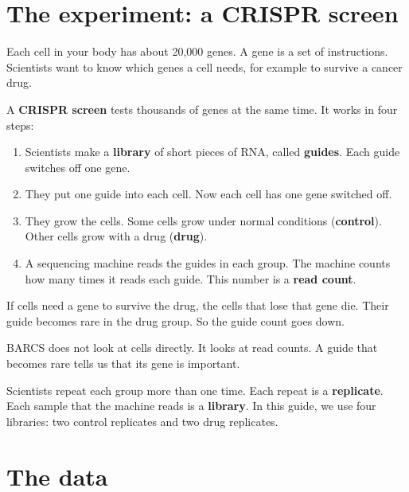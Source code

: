 \section{The experiment: a CRISPR screen}

Each cell in your body has about 20{,}000 genes. A gene is a set of
instructions. Scientists want to know which genes a cell needs, for example
to survive a cancer drug.

A \textbf{CRISPR screen} tests thousands of genes at the same time. It works
in four steps:

\begin{enumerate}
\item Scientists make a \textbf{library} of short pieces of RNA, called
  \textbf{guides}. Each guide switches off one gene.
\item They put one guide into each cell. Now each cell has one gene switched
  off.
\item They grow the cells. Some cells grow under normal conditions
  (\textbf{control}). Other cells grow with a drug (\textbf{drug}).
\item A sequencing machine reads the guides in each group. The machine
  counts how many times it reads each guide. This number is a
  \textbf{read count}.
\end{enumerate}

If cells need a gene to survive the drug, the cells that lose that gene die.
Their guide becomes rare in the drug group. So the guide count goes down.

\begin{remember}
BARCS does not look at cells directly. It looks at read counts. A guide that
becomes rare tells us that its gene is important.
\end{remember}

Scientists repeat each group more than one time. Each repeat is a
\textbf{replicate}. Each sample that the machine reads is a \textbf{library}.
In this guide, we use four libraries: two control replicates and two drug
replicates.

\section{The data}

